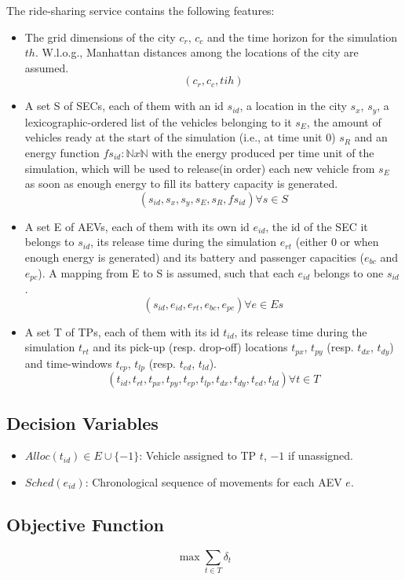 The ride-sharing service contains the following features:
\begin{itemize}
\item The grid dimensions of the city $c_r$,  $c_c$ and the time horizon for the simulation $th$.  W.l.o.g.,  Manhattan distances among the locations of the city are assumed. 
\[
( c_r, c_c,  tih ) 
\]
\item A set S of SECs, each of them with an id $s_{id}$, a location in the city $s_x$,  $s_y$, a lexicographic-ordered list of the vehicles belonging to it $s_E$, the amount of vehicles ready at the start of the simulation (i.e., at time unit 0) $s_R$ and an energy function $fs_{id}:  \mathbb{N} x \mathbb{N}$ with the energy produced per time unit of the simulation, which will be used to release(in order) each new vehicle from $s_E$ as soon as enough energy to fill its battery capacity is generated. 
\[
( s_{id}, s_x, s_y, s_E,  s_R, fs_{id} ) \forall s\in S 
\]
\item A set E of AEVs, each of them with its own id $e_{id}$, the id of the SEC it belongs to $s_{id}$,  its release time during the simulation $e_{rt}$ (either 0 or when enough energy is generated) and its battery and passenger capacities ($e_{bc}$ and $e_{pc}$).  A mapping from E to S is assumed, such that each $e_{id}$ belongs to one $s_{id}$.
\[
( s_{id},  e_{id},  e_{rt},  e_{bc}, e_{pc} ) \forall e\in Es 
\]
\item A set T of TPs, each of them with its id $t_{id}$, its release time during the simulation $t_{rt}$ and its pick-up (resp. drop-off) locations $ t_{px}$, $ t_{py}$ (resp.  $ t_{dx}$, $ t_{dy}$) and time-windows $ t_{ep}$, $ t_{lp}$ (resp. $ t_{ed}$, $ t_{ld}$).  
\[
( t_{id},  t_{rt},  t_{px}, t_{py},  t_{ep}, t_{lp},  t_{dx}, t_{dy},  t_{ed}, t_{ld} ) \forall t\in T
\]
\end{itemize}

\subsection{Decision Variables}
\begin{itemize}
    \item $Alloc(t_{id}) \in E \cup \{-1\}$: Vehicle assigned to TP $t$, $-1$ if unassigned.
    \item $Sched(e_{id})$: Chronological sequence of movements for each AEV $e$.
\end{itemize}

\subsection{Objective Function}
\begin{equation}
\max \sum_{t \in T} \delta_t
\end{equation}

